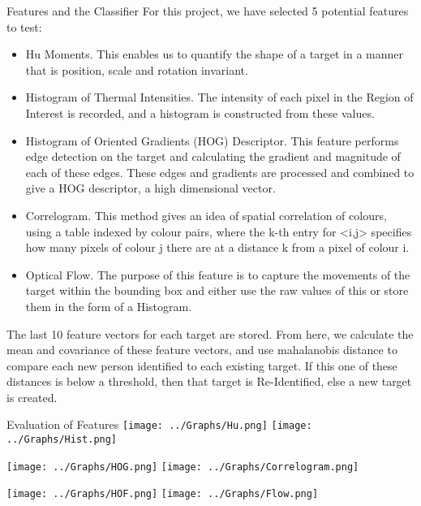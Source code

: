 \documentclass[final]{beamer}
\begin{document}
\begin{frame}{}
\begin{columns}[t]
      \begin{column}{.48\linewidth}
        \begin{block}{Features and the Classifier}
        For this project, we have selected 5 potential features to test:
          \begin{itemize}
          \item Hu Moments. 
          This enables us to quantify the shape of a target in a manner that is position, scale and rotation invariant.
          \item Histogram of Thermal Intensities. 
          The intensity of each pixel in the Region of Interest is recorded, and a histogram is constructed from these values.
          \item Histogram of Oriented Gradients (HOG) Descriptor. 
          This feature performs edge detection on the target and calculating the gradient and magnitude of each of these edges. These edges and gradients are processed and combined to give a HOG descriptor, a high dimensional vector. 
          \item Correlogram. 
           This method gives an idea of spatial correlation of colours, using a table indexed by colour pairs, where the k-th entry for <i,j> specifies how many pixels of colour j there are at a distance k from a pixel of colour i.
          \item Optical Flow. 
          The purpose of this feature is to capture the movements of the target within the bounding box and either use the raw values of this or store them in the form of a Histogram.
          \end{itemize}
          The last 10 feature vectors for each target are stored. From here, we calculate the mean and covariance of these feature vectors, and use mahalanobis distance to compare each new person identified to each existing target. If this one of these distances is below a threshold, then that target is Re-Identified, else a new target is created.
        \end{block}

        \begin{block}{Evaluation of Features}
		\texttt{[image: ../Graphs/Hu.png]}
		\texttt{[image: ../Graphs/Hist.png]}
		
		\texttt{[image: ../Graphs/HOG.png]}
		\texttt{[image: ../Graphs/Correlogram.png]}
		
		\texttt{[image: ../Graphs/HOF.png]}
		\texttt{[image: ../Graphs/Flow.png]}
		

\end{block}
\end{column}
\end{columns}
\end{frame}
\end{document}
